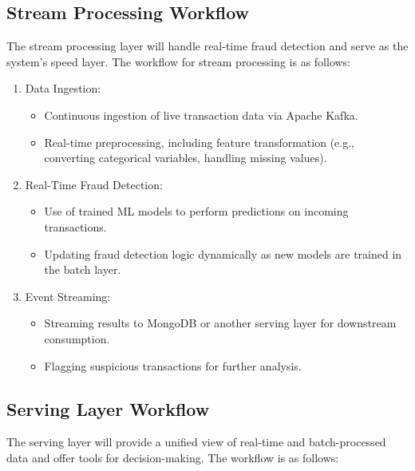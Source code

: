 \documentclass[12pt,a4paper, hidelinks]{article}
\begin{document}
\subsection{Stream Processing Workflow}
The stream processing layer will handle real-time fraud detection and serve as the system's speed layer. The workflow for stream processing is as follows:

\begin{enumerate}
    \item Data Ingestion:
        \begin{itemize}
            \item Continuous ingestion of live transaction data via Apache Kafka.
            \item Real-time preprocessing, including feature transformation (e.g., converting categorical variables, handling missing values).
        \end{itemize}
    \item Real-Time Fraud Detection:
        \begin{itemize}
            \item Use of trained ML models to perform predictions on incoming transactions.
            \item Updating fraud detection logic dynamically as new models are trained in the batch layer.
        \end{itemize}
    \item Event Streaming:
        \begin{itemize}
            \item Streaming results to MongoDB or another serving layer for downstream consumption.
            \item Flagging suspicious transactions for further analysis.
        \end{itemize}
\end{enumerate}

\subsection{Serving Layer Workflow}
The serving layer will provide a unified view of real-time and batch-processed data and offer tools for decision-making. The workflow is as follows:
\end{document}
